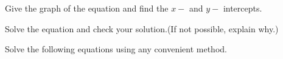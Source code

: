 \documentclass[11pt]{exam}
\begin{document}
\begin{questions}

\addpoints
\question[15] Give the graph of the equation and find the $x-$ and $y-$ intercepts.
\noaddpoints
{}
\newpage
\addpoints
\question[15] Solve the equation and check your solution.(If not possible, explain why.)
\noaddpoints
{}

\newpage
\addpoints
\question[20] Solve the following equations using any convenient method.
\noaddpoints %
\begin{multicols}{2}
\end{multicols}
\end{questions}
\end{document}
